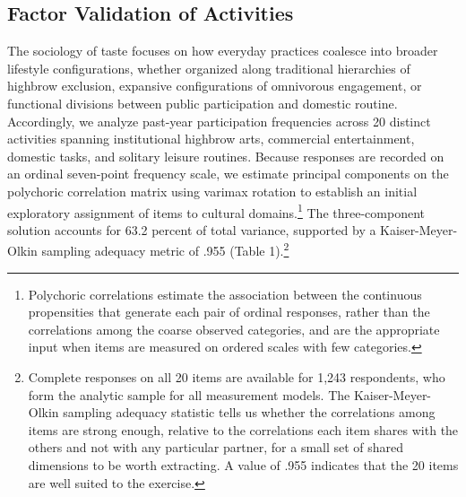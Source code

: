 \documentclass[
  12pt
]{article}
\author{}
\date{}
\begin{document}
\hypertarget{factor-validation-of-activities}{%
\subsection{Factor Validation of Activities}\label{factor-validation-of-activities}}

The sociology of taste focuses on how everyday practices coalesce into broader lifestyle configurations, whether organized along traditional hierarchies of highbrow exclusion, expansive configurations of omnivorous engagement, or functional divisions between public participation and domestic routine. Accordingly, we analyze past-year participation frequencies across 20 distinct activities spanning institutional highbrow arts, commercial entertainment, domestic tasks, and solitary leisure routines. Because responses are recorded on an ordinal seven-point frequency scale, we estimate principal components on the polychoric correlation matrix using varimax rotation to establish an initial exploratory assignment of items to cultural domains.\footnote{Polychoric correlations estimate the association between the continuous propensities that generate each pair of ordinal responses, rather than the correlations among the coarse observed categories, and are the appropriate input when items are measured on ordered scales with few categories.}  The three-component solution accounts for 63.2 percent of total variance, supported by a Kaiser-Meyer-Olkin sampling adequacy metric of .955 (Table 1).\footnote{Complete responses on all 20 items are available for 1,243 respondents, who form the analytic sample for all measurement models. The Kaiser-Meyer-Olkin sampling adequacy statistic tells us whether the correlations among items are strong enough, relative to the correlations each item shares with the others and not with any particular partner, for a small set of shared dimensions to be worth extracting. A value of .955 indicates that the 20 items are well suited to the exercise.} 
\end{document}
